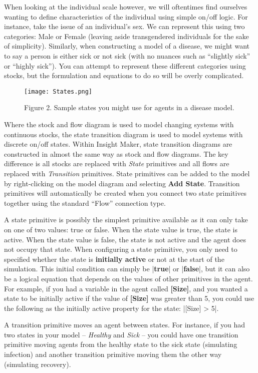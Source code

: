 \documentclass[]{memoir}
\makeatletter
\newcommand{\KeywordTok}[1]{\textcolor[rgb]{0.00,0.44,0.13}{\textbf{{#1}}}}
\newcommand{\DecValTok}[1]{\textcolor[rgb]{0.25,0.63,0.44}{{#1}}}
\newcommand{\NormalTok}[1]{{#1}}
\def\maxwidth{\ifdim\Gin@nat@width>\linewidth\linewidth
\else\Gin@nat@width\fi}
\let\Oldincludegraphics\includegraphics
\renewcommand{\includegraphics}[1]{\Oldincludegraphics[width=\maxwidth]{#1}}
\newcommand{\p}[1]{\textbf{{[}#1{]}}}
\renewcommand{\u}[1]{\textbf{#1}}
\renewcommand{\a}[1]{\textbf{#1}}
\makeatother
\begin{document}
When looking at the individual scale however, we will oftentimes find
ourselves wanting to define characteristics of the individual using
simple on/off logic. For instance, take the issue of an individual's
sex. We can represent this using two categories: Male or Female (leaving
aside transgendered individuals for the sake of simplicity). Similarly,
when constructing a model of a disease, we might want to say a person is
either sick or not sick (with no nuances such as ``slightly sick'' or
``highly sick''). You can attempt to represent these different
categories using stocks, but the formulation and equations to do so will
be overly complicated.

\begin{figure}[htbp]
\centering
\texttt{[image: States.png]}
\caption{Figure 2. Sample states you might use for agents in a disease
model.}
\end{figure}

Where the stock and flow diagram is used to model changing systems with
continuous stocks, the state transition diagram is used to model systems
with discrete on/off states. Within Insight Maker, state transition
diagrams are constructed in almost the same way as stock and flow
diagrams. The key difference is all stocks are replaced with
\emph{State} primitives and all flows are replaced with
\emph{Transition} primitives. State primitives can be added to the model
by right-clicking on the model diagram and selecting \u{Add State}.
Transition primitives will automatically be created when you connect two
state primitives together using the standard ``Flow'' connection type.

A state primitive is possibly the simplest primitive available as it can
only take on one of two values: true or false. When the state value is
true, the state is active. When the state value is false, the state is
not active and the agent does not occupy that state. When configuring a
state primitive, you only need to specified whether the state is
\a{initially active} or not at the start of the simulation. This initial
condition can simply be |\KeywordTok{true}| or |\KeywordTok{false}|, but
it can also be a logical equation that depends on the values of other
primitives in the agent. For example, if you had a variable in the agent
called \p{Size}, and you wanted a state to be initially active if the
value of \p{Size} was greater than 5, you could use the following as the
initially active property for the state:
|\NormalTok{[Size] > }\DecValTok{5}|.

A transition primitive moves an agent between states. For instance, if
you had two states in your model -- \emph{Healthy} and \emph{Sick} --
you could have one transition primitive moving agents from the healthy
state to the sick state (simulating infection) and another transition
primitive moving them the other way (simulating recovery).
\end{document}
